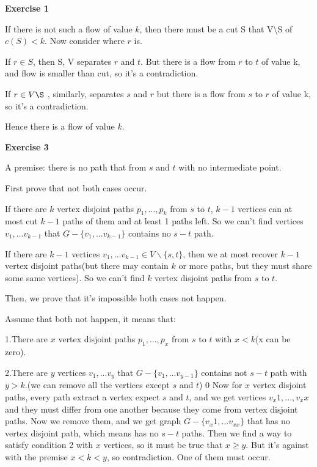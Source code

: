 \documentclass{article}
\title{Homework #5}
\author{Coffee Automaton}
\date{October 2019}
\begin{document}
\maketitle

\textbf{Exercise 1}

If there is not such a flow of value $k$, then there must be a cut S that V\backslash S of $c(S) < k$. Now consider where $r$ is.

If $r \in S$, then S, V separates $r$ and $t$. But there is a flow from $r$ to $t$ of value k, and flow is smaller than cut, so it's a contradiction.

If $r \in V\S$ , similarly, separates $s$ and $r$ but there is a flow from $s$ to $r$ of value k, so it's a contradiction.

Hence there is a flow of value $k$.



\textbf{Exercise 3}

A premise: there is no path that from $s$ and $t$ with no intermediate point.

First prove that not both cases occur.

If there are $k$ vertex disjoint paths $p_1 , ...,  p_k$ from $s$ to $t$, $k-1$ vertices can at most cut $k-1$ paths of them and at least 1 paths left. So we can't find vertices $v_1, ...v_{k-1}$ that $G - \{v_1, ...v_{k-1}\}$ contains no $s-t$ path.

If there are $k-1$ vertices $v_1, ...v_{k-1} \in V \backslash \{ s,t \}$, then we at most recover $k-1$ vertex disjoint paths(but there may contain $k$ or more paths, but they must share some same vertices). So we can't find $k$ vertex disjoint paths from $s$ to $t$.

Then, we prove that it's impossible both cases not happen.

Assume that both not happen, it means that:

1.There are $x$ vertex disjoint paths $p_1, ... , p_x$ from $s$ to $t$ with $x < k$(x can be zero).

2.There are $y$ vertices $v_1,... v_y$ that $G - \{v_1, ...v_{y-1}\}$ contains not $s-t$ path with $y > k$.(we can remove all the vertices except $s$ and $t$)
0
Now for $x$ vertex disjoint paths, every path extract a vertex expect $s$ and $t$, and we get vertices $v_x1, ... , v_xx$ and they must differ from one another because they come from vertex disjoint paths. Now we remove them, and we get graph $G - \{v_x1, ...v_{xx}\}$ that has no vertex disjoint path, which means has no $s-t$ paths. Then we find a way to satisfy condition 2 with $x$ vertices, so it must be true that $x \geqslant y$. But it's against with the premise $x < k < y$, so contradiction. One of them must occur.
\end{document}
